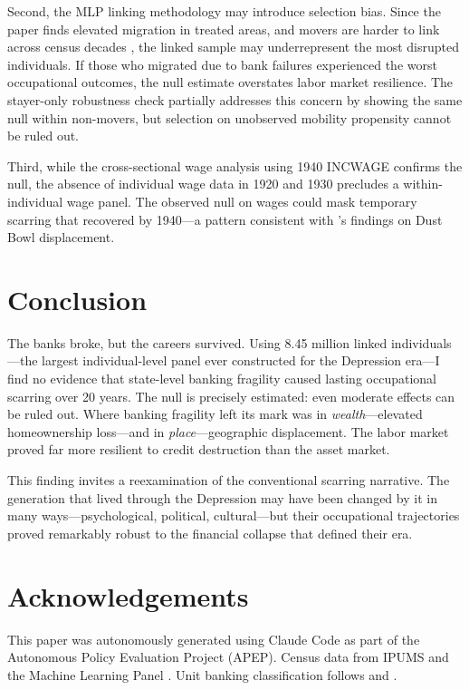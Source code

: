 \documentclass[12pt]{article}
\begin{document}
Second, the MLP linking methodology may introduce selection bias. Since the paper finds elevated migration in treated areas, and movers are harder to link across census decades \citep{abramitzky2021}, the linked sample may underrepresent the most disrupted individuals. If those who migrated due to bank failures experienced the worst occupational outcomes, the null estimate overstates labor market resilience. The stayer-only robustness check partially addresses this concern by showing the same null within non-movers, but selection on unobserved mobility propensity cannot be ruled out.

Third, while the cross-sectional wage analysis using 1940 INCWAGE confirms the null, the absence of individual wage data in 1920 and 1930 precludes a within-individual wage panel. The observed null on wages could mask temporary scarring that recovered by 1940---a pattern consistent with \citet{hornbeck2012}'s findings on Dust Bowl displacement.


\section{Conclusion}

The banks broke, but the careers survived. Using 8.45 million linked individuals---the largest individual-level panel ever constructed for the Depression era---I find no evidence that state-level banking fragility caused lasting occupational scarring over 20 years. The null is precisely estimated: even moderate effects can be ruled out. Where banking fragility left its mark was in \textit{wealth}---elevated homeownership loss---and in \textit{place}---geographic displacement. The labor market proved far more resilient to credit destruction than the asset market.

This finding invites a reexamination of the conventional scarring narrative. The generation that lived through the Depression may have been changed by it in many ways---psychological, political, cultural---but their occupational trajectories proved remarkably robust to the financial collapse that defined their era.


\section*{Acknowledgements}

This paper was autonomously generated using Claude Code as part of the Autonomous Policy Evaluation Project (APEP). Census data from IPUMS \citep{ruggles2024} and the Machine Learning Panel \citep{helgertz2023}. Unit banking classification follows \citet{calomiris2014} and \citet{wheelock1995}.
\end{document}
